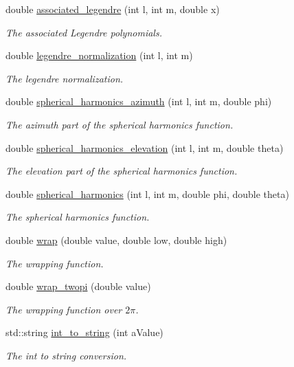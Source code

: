 \begin{DoxyCompactItemize}
double \hyperlink{namespace_hoa_ad044777140feb80ca758bb11ad1173d1}{associated\-\_\-legendre} (int l, int m, double x)
\begin{DoxyCompactList}\small\item\em The associated Legendre polynomials. \end{DoxyCompactList}\item 
double \hyperlink{namespace_hoa_a2e493b30326b3dab0ea704ed7317b002}{legendre\-\_\-normalization} (int l, int m)
\begin{DoxyCompactList}\small\item\em The legendre normalization. \end{DoxyCompactList}\item 
double \hyperlink{namespace_hoa_a6bbe532639fcafb344a9f20f07291402}{spherical\-\_\-harmonics\-\_\-azimuth} (int l, int m, double phi)
\begin{DoxyCompactList}\small\item\em The azimuth part of the spherical harmonics function. \end{DoxyCompactList}\item 
double \hyperlink{namespace_hoa_a4268534c4173f0d28ca791cca1c233e6}{spherical\-\_\-harmonics\-\_\-elevation} (int l, int m, double theta)
\begin{DoxyCompactList}\small\item\em The elevation part of the spherical harmonics function. \end{DoxyCompactList}\item 
double \hyperlink{namespace_hoa_a3bd99f2110f1b0c424b9cfaf0938c04d}{spherical\-\_\-harmonics} (int l, int m, double phi, double theta)
\begin{DoxyCompactList}\small\item\em The spherical harmonics function. \end{DoxyCompactList}\item 
double \hyperlink{namespace_hoa_a5461cb6a0740423261895e0453a32ce3}{wrap} (double value, double low, double high)
\begin{DoxyCompactList}\small\item\em The wrapping function. \end{DoxyCompactList}\item 
double \hyperlink{namespace_hoa_a8e369981026a7cedf7b832d639c15b90}{wrap\-\_\-twopi} (double value)
\begin{DoxyCompactList}\small\item\em The wrapping function over $2\pi$. \end{DoxyCompactList}\item 
std\-::string \hyperlink{namespace_hoa_a383e28307f0bbd7c0e4af194ebabe66f}{int\-\_\-to\-\_\-string} (int a\-Value)
\begin{DoxyCompactList}\small\item\em The int to string conversion. \end{DoxyCompactList}\end{DoxyCompactItemize}


